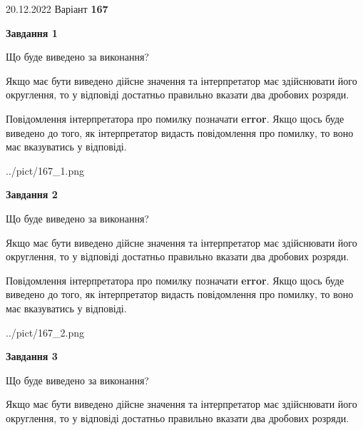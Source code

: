 \documentclass[12pt, ukrainian]{article}
\begin{document}
{20.12.2022 Варіант \No \textbf { 167 }\par}
{
\begin {Large}

{\begin {center}\textbf{Завдання 1}\end {center}}\par
Що буде виведено за виконання? \par

Якщо має бути виведено дійсне значення та інтерпретатор має здійснювати його округлення, 
то у відповіді достатньо правильно вказати два дробових розряди.

Повідомлення інтерпретатора про помилку позначати \textbf{error}.
Якщо щось буде виведено до того, як інтерпретатор видасть повідомлення про помилку, 
то воно має вказуватись у відповіді. \par

\begin{center}
	{../pict/167_1.png}
\end{center}
\newpage

{\begin {center}\textbf{Завдання 2}\end {center}}\par
Що буде виведено за виконання? \par

Якщо має бути виведено дійсне значення та інтерпретатор має здійснювати його округлення, 
то у відповіді достатньо правильно вказати два дробових розряди.

Повідомлення інтерпретатора про помилку позначати \textbf{error}.
Якщо щось буде виведено до того, як інтерпретатор видасть повідомлення про помилку, 
то воно має вказуватись у відповіді. \par

\begin{center}
	{../pict/167_2.png}
\end{center}
\newpage

{\begin {center}\textbf{Завдання 3}\end {center}}\par
Що буде виведено за виконання? \par

Якщо має бути виведено дійсне значення та інтерпретатор має здійснювати його округлення, 
то у відповіді достатньо правильно вказати два дробових розряди.


\end{Large}}
\end{document}
